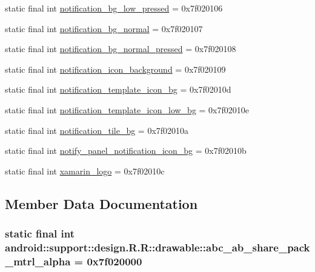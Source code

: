 \begin{CompactItemize}
\item 
static final int \hyperlink{classandroid_1_1support_1_1design_1_1_r_1_1drawable_8789f7b7e2505a57d91eb509d70abdf8}{notification\_\-bg\_\-low\_\-pressed} = 0x7f020106
\item 
static final int \hyperlink{classandroid_1_1support_1_1design_1_1_r_1_1drawable_b3c6de6526f66f8b0bc45b9ab5f4afa0}{notification\_\-bg\_\-normal} = 0x7f020107
\item 
static final int \hyperlink{classandroid_1_1support_1_1design_1_1_r_1_1drawable_9cecef598e9d512ae5d3f10059c2aa7c}{notification\_\-bg\_\-normal\_\-pressed} = 0x7f020108
\item 
static final int \hyperlink{classandroid_1_1support_1_1design_1_1_r_1_1drawable_6ddb8968ee4e9eb255d671557c5705a8}{notification\_\-icon\_\-background} = 0x7f020109
\item 
static final int \hyperlink{classandroid_1_1support_1_1design_1_1_r_1_1drawable_c2befe5eb38976efaba3fe42060522ce}{notification\_\-template\_\-icon\_\-bg} = 0x7f02010d
\item 
static final int \hyperlink{classandroid_1_1support_1_1design_1_1_r_1_1drawable_50571d769dda35a1cedc97760f8eb709}{notification\_\-template\_\-icon\_\-low\_\-bg} = 0x7f02010e
\item 
static final int \hyperlink{classandroid_1_1support_1_1design_1_1_r_1_1drawable_26873cdeedaab3091f40aa06cf091e28}{notification\_\-tile\_\-bg} = 0x7f02010a
\item 
static final int \hyperlink{classandroid_1_1support_1_1design_1_1_r_1_1drawable_15c1f1ab78e5cbd586333830dcbb4c7e}{notify\_\-panel\_\-notification\_\-icon\_\-bg} = 0x7f02010b
\item 
static final int \hyperlink{classandroid_1_1support_1_1design_1_1_r_1_1drawable_cd86843b967e7fa3a9e57a323008addf}{xamarin\_\-logo} = 0x7f02010c
\end{CompactItemize}


\subsection{Member Data Documentation}
\hypertarget{classandroid_1_1support_1_1design_1_1_r_1_1drawable_e36c1d2180730cecaafb18af7e13a24d}{
\subsubsection[{abc\_\-ab\_\-share\_\-pack\_\-mtrl\_\-alpha}]{\setlength{\rightskip}{0pt plus 5cm}static final int android::support::design.R.R::drawable::abc\_\-ab\_\-share\_\-pack\_\-mtrl\_\-alpha = 0x7f020000}}
\label{classandroid_1_1support_1_1design_1_1_r_1_1drawable_e36c1d2180730cecaafb18af7e13a24d}


